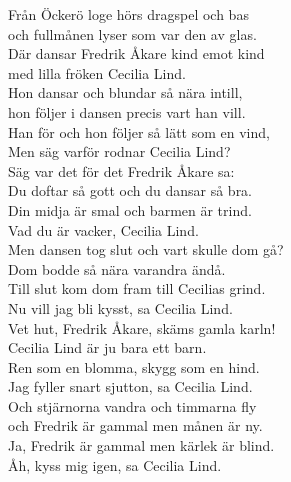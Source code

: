 \documentclass[a6paper,10pt]{article}
\begin{document}
\setlength{\oddsidemargin}{-0.37in}
\noindent
\begin{center}
\end{center}
\begin{lyrics}
Från Öckerö loge hörs dragspel och bas\\
och fullmånen lyser som var den av glas.\\
Där dansar Fredrik Åkare kind emot kind\\
med lilla fröken Cecilia Lind.
\vspace{5pt}\\
Hon dansar och blundar så nära intill,\\
hon följer i dansen precis vart han vill.\\
Han för och hon följer så lätt som en vind,\\
Men säg varför rodnar Cecilia Lind?
\vspace{5pt}\\
Säg var det för det Fredrik Åkare sa:\\
Du doftar så gott och du dansar så bra.\\
Din midja är smal och barmen är trind.\\
Vad du är vacker, Cecilia Lind.
\vspace{5pt}\\
Men dansen tog slut och vart skulle dom gå?\\
Dom bodde så nära varandra ändå.\\
Till slut kom dom fram till Cecilias grind.\\
Nu vill jag bli kysst, sa Cecilia Lind.
\vspace{5pt}\\
Vet hut, Fredrik Åkare, skäms gamla karln!\\
Cecilia Lind är ju bara ett barn.\\
Ren som en blomma, skygg som en hind.\\
Jag fyller snart sjutton, sa Cecilia Lind.
\vspace{5pt}\\
Och stjärnorna vandra och timmarna fly\\
och Fredrik är gammal men månen är ny.\\
Ja, Fredrik är gammal men kärlek är blind.\\
Åh, kyss mig igen, sa Cecilia Lind.
\end{lyrics}
\end{document}
